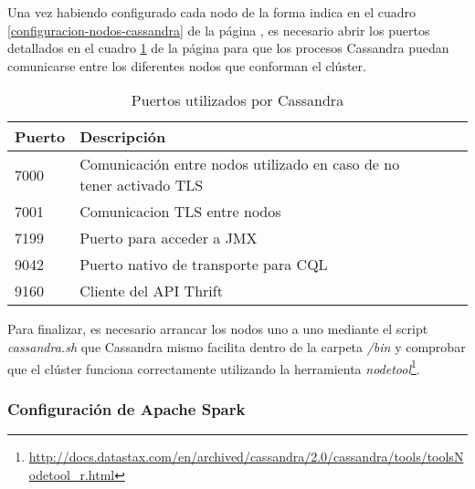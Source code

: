 Una vez habiendo configurado cada nodo de la forma indica en el cuadro \ref{configuracion-nodos-cassandra} de la página \pageref{configuracion-nodos-cassandra}, es necesario abrir los puertos detallados en el cuadro \ref{puertos-cassandra} de la página \pageref{puertos-cassandra} para que los procesos Cassandra puedan comunicarse entre los diferentes nodos que conforman el clúster.\\

\begin{table}[h!]
	\centering
	\begin{tabular}{|l||l|l|l|}
		
		\hline
		
		\textbf{Puerto} & \textbf{Descripción} \\
		
		\hline
		\hline
		
		7000 & Comunicación entre nodos utilizado en caso de no tener activado TLS \\
		
		\hline
		
		7001 & Comunicacion TLS entre nodos \\
		
		\hline
		
		7199 & Puerto para acceder a JMX \\ 
		
		\hline
		
		9042 & Puerto nativo de transporte para CQL \\
		
		\hline
		
		9160 & Cliente del API Thrift \\
		
		\hline
		
	\end{tabular}
	\caption{Puertos utilizados por Cassandra}
	\label{puertos-cassandra}
\end{table}

Para finalizar, es necesario arrancar los nodos uno a uno mediante el script \textit{cassandra.sh} que Cassandra mismo facilita dentro de la carpeta \textit{/bin} y comprobar que el clúster funciona correctamente utilizando la herramienta \textit{nodetool}\footnote{\url{http://docs.datastax.com/en/archived/cassandra/2.0/cassandra/tools/toolsNodetool_r.html}}.

\subsubsection{Configuración de Apache Spark}

